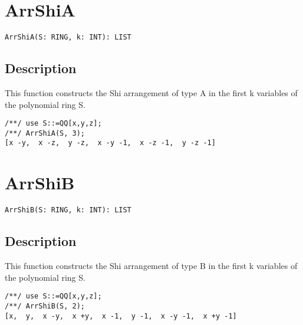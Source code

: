 \documentclass[a4paper]{mybook}
\newenvironment{command}{}{} %
\begin{document}
\section{ArrShiA}
\label{ArrShiA}
\begin{command} %


\begin{Verbatim}[label=syntax, rulecolor=\color{MidnightBlue},
frame=single]
ArrShiA(S: RING, k: INT): LIST 
\end{Verbatim}


\subsection*{Description}

This function constructs the Shi arrangement of type A in the first k variables of the polynomial ring S.
\begin{Verbatim}[label=example, rulecolor=\color{PineGreen}, frame=single]
/**/ use S::=QQ[x,y,z];	
/**/ ArrShiA(S, 3);
[x -y,  x -z,  y -z,  x -y -1,  x -z -1,  y -z -1]
\end{Verbatim}


\end{command} %

\section{ArrShiB}
\label{ArrShiB}
\begin{command} %


\begin{Verbatim}[label=syntax, rulecolor=\color{MidnightBlue},
frame=single]
ArrShiB(S: RING, k: INT): LIST 
\end{Verbatim}


\subsection*{Description}

This function constructs the Shi arrangement of type B in the first k variables of the polynomial ring S.
\begin{Verbatim}[label=example, rulecolor=\color{PineGreen}, frame=single]
/**/ use S::=QQ[x,y,z];	
/**/ ArrShiB(S, 2);
[x,  y,  x -y,  x +y,  x -1,  y -1,  x -y -1,  x +y -1]
\end{Verbatim}


\end{command} %
\end{document}
